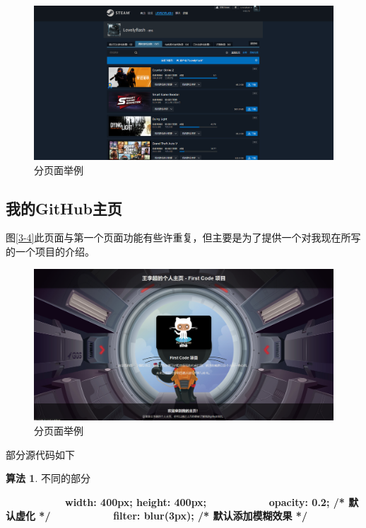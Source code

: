 \documentclass[supercite]{Experimental_Report}
\theoremstyle{definition}
\newtheorem{alg}{算法}[section]
\begin{document}
\begin{figure}[htb]
	\begin{center}
		\includegraphics[scale=0.30]{images/3-3.png}
		\caption{分页面举例}
		\label{fig3-3}
	\end{center}
\end{figure}

\subsection{我的GitHub主页}

图\ref{3-4}此页面与第一个页面功能有些许重复，但主要是为了提供一个对我现在所写的一个项目的介绍。

\begin{figure}[htb]
	\begin{center}
		\includegraphics[scale=0.20]{images/3-4.png}
		\caption{分页面举例}
		\label{fig3-4}
	\end{center}
\end{figure}

部分源代码如下

\begin{shaded*}
	\begin{alg}{不同的部分}
		\label{alg:1}
		\begin{algorithmic}
			\State \ \ \ \ \ \ \ \ \ \ \ \ \textbf{width: 400px;  height: 400px; }
			\State \ \ \ \ \ \ \ \ \ \ \ \ \textbf{opacity: 0.2; /* 默认虚化 */}
			\State \ \ \ \ \ \ \ \ \ \ \ \ \textbf{filter: blur(3px); /* 默认添加模糊效果 */}
		\end{algorithmic}
	\end{alg}
	\end{shaded*}
\end{document}
